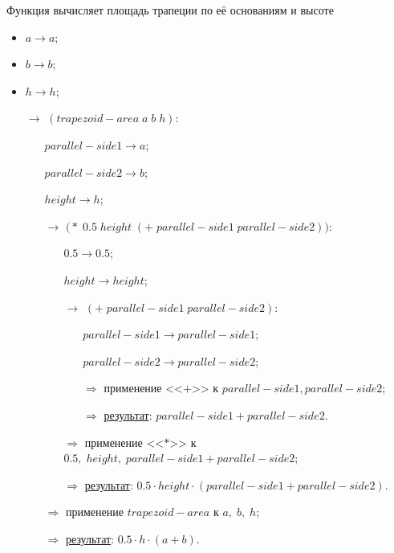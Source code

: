 \problem Функция вычисляет площадь трапеции по её основаниям и высоте


\begin{itemize}
	\item $a \to a$;
	\item $b \to b$;
	\item $h \to h$;
	\item[$\longrightarrow$] $(trapezoid\!-\!area\; a\; b\; h)$:
	\begin{itemize}
		\item[\textbullet] $parallel\!-\!side1 \to a$;
		\item[\textbullet] $parallel\!-\!side2 \to b$;
		\item[\textbullet] $height \to h$;
		\item[$\longrightarrow$] $\bigl(*\; 0.5\; height\; (+\; parallel\!-\!side1\; parallel\!-\!side2)\bigr)$:
		\begin{itemize}
			\item[\textbullet] $0.5 \to 0.5$;
			\item[\textbullet] $height \to height$;
			\item[$\longrightarrow$] $(+\; parallel\!-\!side1\; parallel\!-\!side2)$:
			\begin{itemize}
				\item[\textbullet] $parallel\!-\!side1 \to parallel\!-\!side1$;
				\item[\textbullet] $parallel\!-\!side2 \to parallel\!-\!side2$;
				\item[$\Longrightarrow$] применение <<$+$>> к $parallel\!-\!side1, parallel\!-\!side2$;
				\item[$\Longrightarrow$] \underline{результат}: $parallel\!-\!side1 + parallel\!-\!side2$.
			\end{itemize}
			\item[$\Longrightarrow$] применение <<$*$>> к $0.5,\; height,\; parallel\!-\!side1 + parallel\!-\!side2$;
			\item[$\Longrightarrow$] \underline{результат}: $0.5 \cdot height \cdot (parallel\!-\!side1 + parallel\!-\!side2)$.
		\end{itemize}
		\item[$\Longrightarrow$] применение $trapezoid\!-\!area$ к $a,\; b,\; h$;
		\item[$\Longrightarrow$] \underline{результат}: $0.5 \cdot h \cdot (a + b)$.
	\end{itemize}
\end{itemize}



